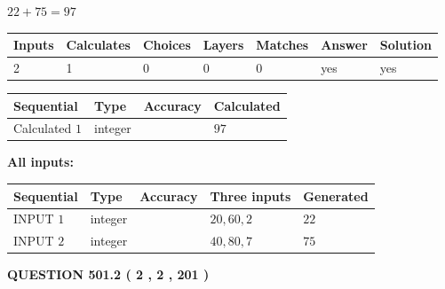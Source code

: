 \documentclass[12pt]{article}
\begin{document}
 

$ %
22 +  %
75=   %
97$
 
 
\noindent{}
 
 

 
   
   
   
   
\noindent\begin{tabular}{|l|l|l|l|l|l|l|}
 \hline
Inputs & Calculates & Choices & Layers & Matches & Answer & Solution \\ \hline
 2  & 
 1  & 
 0
  & 
 0  & 
 0  & 
  yes & 
  yes 
  \\ \hline
 \end{tabular}
   
   
   
   
\noindent{}
   
   
  
  
\noindent\begin{tabular}{|l|l|l|l|}
\hline
 Sequential & Type & Accuracy & Calculated \\ 
\hline
 
 
  Calculated $  1 $ & integer &  & 
  $ 97 $ 
 \\  \hline  
 \end{tabular}
   
   
   
   
\noindent\vspace{0.1in}\hspace{-0.08in} {\textbf{\Large{All inputs: }}}
   
   
  
  
\noindent\begin{tabular}{|l|l|l|l|l|}
\hline
 Sequential & Type & Accuracy & Three inputs & Generated \\ 
\hline
 
 
  INPUT $  1 $ & integer &  & $
 20
 , 
 60
 , 
 2
 $ & $ 22 $ 
 \\  \hline  
 
 
  INPUT $  2 $ & integer &  & $
 40
 , 
 80
 , 
 7
 $ & $ 75 $ 
 \\  \hline  
 \end{tabular}
   
   
  
\vspace{0.2in}
  
{\textbf{\Large{QUESTION
501.2 
 ( 2 , 2 , 201 )
}}}
  
\end{document}
